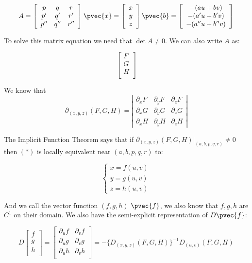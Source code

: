 \documentclass[11 pt, twoside]{article}
\begin{document}
\[
A = 
\left[\begin{array}{ccc}
p & q & r\\
p' & q' & r'\\
p'' & q'' & r''
\end{array}\right]
\hfill
\pvec{x} =
\left[\begin{array}{c}
x\\
y\\
z\\
\end{array}\right]
\hfill
\pvec{b} = 
\left[\begin{array}{c}
-(au + bv) \\
-(a'u + b'v) \\
-(a''u + b''v) \\
\end{array}\right]
\]

To solve this matrix equation we need that $\det A \neq 0$. We can also write
$A$ as:

\[
\left[\begin{array}{c}
F \\
G \\
H \\
\end{array}\right]
\]

We know that
$$\partial_{(x, y, z)} (F, G, H) = \left|
\begin{array}{ccc}
\partial_x F & \partial_y F & \partial_z F \\
\partial_x G & \partial_y G & \partial_z G \\
\partial_x H & \partial_y H & \partial_z H
\end{array}
\right|$$

The Implicit Function Theorem says that if $\partial_{(x, y, z)} (F, G, H)
|_{(a, b, p, q, r)} \neq 0$ then $(*)$ is locally equivalent near $(a, b, p, q,
r)$ to:

\[
\begin{cases}
x = f(u, v) \\
y = g(u, v) \\
z = h(u, v)
\end{cases}
\]

And we call the vector function $(f, g, h)$ $\pvec{f}$, we also know that $f, g,
h$ are $C^1$ on their domain. We also have the semi-explicit representation of
$D\pvec{f}$:

\[
D\left[\begin{array}{c}
f \\
g \\
h \\
\end{array}\right] = 
\left[\begin{array}{cc}
\partial_u f & \partial_v f \\
\partial_u g & \partial_v g \\
\partial_u h & \partial_v h \\
\end{array}\right] =
-\{D_{(x, y, z)}(F, G, H)\}^{-1} D_{(u, v)} (F, G, H)
\]
\end{document}

